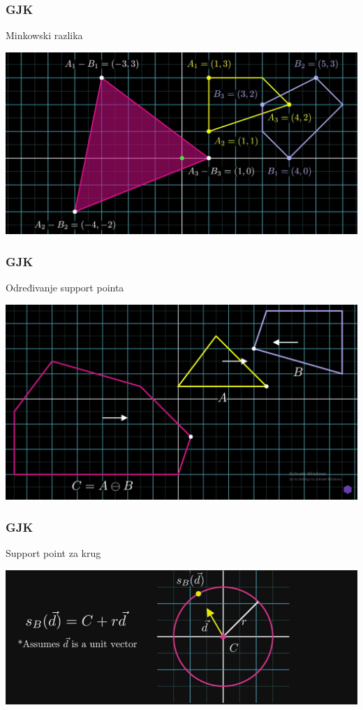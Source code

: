 \documentclass{beamer}
\begin{document}
\begin{frame}
	\frametitle{GJK}
	\Large
	Minkowski razlika
	\begin{center}
		\includegraphics[scale=0.17]{./images/gjk1.png}
	\end{center}
\end{frame}

\begin{frame}
	\frametitle{GJK}
	\Large
	Određivanje support pointa
	\begin{center}
		\includegraphics[scale=0.162]{./images/gjk2.png}
	\end{center}
\end{frame}

\begin{frame}
	\frametitle{GJK}
	\Large
	Support point za krug
	\begin{center}
		\includegraphics[scale=0.33]{./images/gjk3.png}
	\end{center}
\end{frame}
\end{document}
